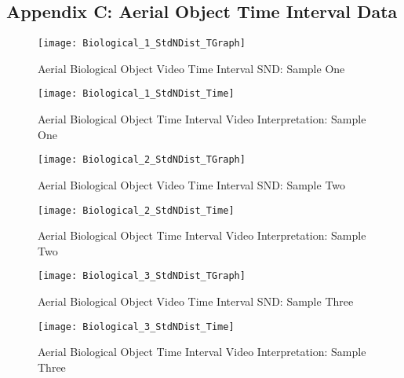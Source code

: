 \subsection{Appendix C: Aerial Object Time Interval Data}

\begin{figure}[H]
	\center 
	\texttt{[image: Biological\_1\_StdNDist\_TGraph]}
	\captionsetup{list=no}
	\caption{Aerial Biological Object Video Time Interval SND: Sample One}
\end{figure}

\begin{figure}[H]
	\center 
	\texttt{[image: Biological\_1\_StdNDist\_Time]}
	\captionsetup{list=no}	
	\caption{Aerial Biological Object Time Interval Video Interpretation: Sample One}
\end{figure}

\newpage  %


\begin{figure}[H]
	\center 
	\texttt{[image: Biological\_2\_StdNDist\_TGraph]}
	\captionsetup{list=no}	
	\caption[Aerial Biological Object Video Time Interval SND: Sample Two]{Aerial Biological Object Video Time Interval SND: Sample Two}
\end{figure}

\begin{figure}[H]
	\center 
	\texttt{[image: Biological\_2\_StdNDist\_Time]}
	\captionsetup{list=no}	
	\caption[Aerial Biological Object Time Interval Video Interpretation: Sample Two]{Aerial Biological Object Time Interval Video Interpretation: Sample Two}
\end{figure}

\newpage  %


\begin{figure}[H]
	\center 
	\texttt{[image: Biological\_3\_StdNDist\_TGraph]}
	\captionsetup{list=no}	
	\caption[Aerial Biological Object Video Time Interval SND: Sample Three]{Aerial Biological Object Video Time Interval SND: Sample Three}
\end{figure}

\begin{figure}[H]
	\center 
	\texttt{[image: Biological\_3\_StdNDist\_Time]}
	\captionsetup{list=no}
	\caption[Aerial Biological Object Time Interval Video Interpretation: Sample Three]{Aerial Biological Object Time Interval Video Interpretation: Sample Three}
\end{figure}


